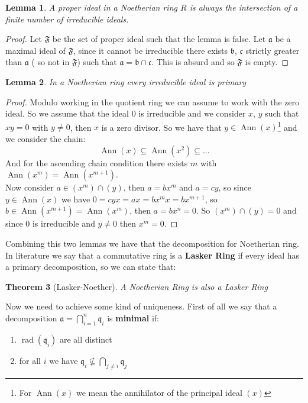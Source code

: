 \documentclass[notitlepage, a4]{book}
\theoremstyle{plain}
\newtheorem{teo}{Theorem}[section]
\newtheorem{lem}[teo]{Lemma}
\theoremstyle{remark}
\theoremstyle{definition}
\newcommand{\q}{\mathfrak{q}}
\newcommand{\A}{\mathfrak{a}}
\newcommand{\B}{\mathfrak{b}}
\newcommand{\Cc}{\mathfrak{c}}
\DeclareMathOperator{\rad}{rad}
\DeclareMathOperator{\Ann}{Ann}
\newcounter{que}
\begin{document}
\begin{lem}
	A proper ideal in a Noetherian ring $ R $ is always the intersection of a finite number of irreducible ideals.
\end{lem}

\begin{proof}
	Let $ \mathfrak{F} $ be the set of proper ideal such that the lemma is false. Let $ \A $ be a maximal ideal of $ \mathfrak{F} $, since it cannot be irreducible there exists $ \B $, $ \Cc $ strictly greater than $ \A $ ( so not in $ \mathfrak{F} $) such that $ \A = \B \cap \Cc $. This is absurd and so $ \mathfrak{F} $ is empty.
\end{proof}

\begin{lem}
	In a Noetherian ring every irreducible ideal is primary
\end{lem}

\begin{proof}
Modulo working in the quotient ring we can assume to work with the zero ideal. So we assume that the ideal $ 0 $ is irreducible and we consider $ x$, $y $ such that $ xy = 0 $ with $ y\neq 0 $, then $ x $ is a zero divisor. So we have that $ y \in \Ann(x) $\footnote{For $ \Ann(x) $ we mean the annihilator of the principal ideal $ (x) $} and we consider the chain:
$$ \Ann(x)  \subseteq \Ann(x^2) \subseteq ...$$
And for the ascending chain condition there exists $ m $ with $ \Ann(x^m)= \Ann(x^{m+1})$. \\
Now consider $ a \in (x^m)\cap (y) $, then $ a = bx^m $ and $ a = cy $, so since $ y \in \Ann(x) $ we have $ 0 = cyx = ax = bx^m x=  bx^{m+1}$, so $ b \in  \Ann(x^{m+1}) = \Ann(x^m) $, then $ a = bx^n = 0 $. So $ (x^m)\cap (y)=0 $ and since $ 0 $ is irreducible and $ y\neq 0 $ then $ x^m=0 $. 
\end{proof}

Combining this two lemmas we have that the decomposition for Noetherian ring. In literature we say that a commutative ring is a \textbf{Lasker Ring} if every ideal has a primary decomposition, so we can state that:

\begin{teo}[Lasker-Noether]
A Noetherian Ring is also a Lasker Ring
\end{teo}
Now we need to achieve some kind of uniqueness. First of all we say that a decomposition $ \A = \bigcap_{i=1}^n \q_i $ is \textbf{minimal} if:
\begin{enumerate}
\item $ \rad(\q_i) $ are all distinct
\item for all $ i $ we have $ \q_i \not \subseteq \bigcap_{j\neq i} \q_j $
\end{enumerate}
\end{document}

